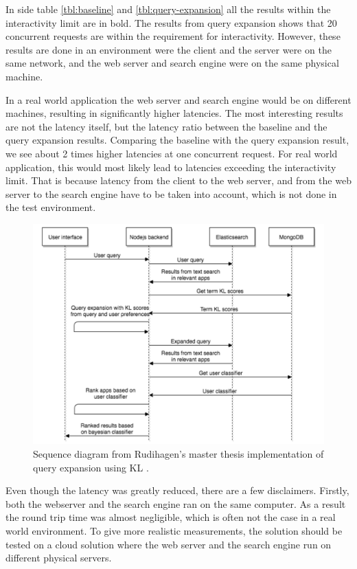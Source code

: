 In side table \ref{tbl:baseline} and \ref{tbl:query-expansion} all the results within the interactivity limit are in bold.
The results from query expansion shows that 20 concurrent requests are within the requirement for interactivity.
However, these results are done in an environment were the client and the server were on the same network,
and the web server and search engine were on the same physical machine.

In a real world application the web server and search engine would be on different machines,
resulting in significantly higher latencies.
The most interesting results are not the latency itself, but the latency ratio between the baseline and the query expansion results.
Comparing the baseline with the query expansion result, we see about 2 times higher latencies at one concurrent request.
For real world application, this would most likely lead to latencies exceeding the interactivity limit.
That is because latency from the client to the web server,
and from the web server to the search engine have to be taken into account,
which is not done in the test environment.


\begin{figure}[h!]
\centering \includegraphics[width=0.9\linewidth]{img/sequence-diagram-search-master-thesis.png}
\caption{Sequence diagram from Rudihagen's master thesis implementation of query expansion using KL \cite[p. 37]{master-thesis}.}
\label{fig:sequence-diagram-search-master}
\end{figure}

Even though the latency was greatly reduced, there are a few disclaimers.
Firstly, both the webserver and the search engine ran on the same computer.
As a result the round trip time was almost negligible, which is often not the case in a real world environment.
To give more realistic measurements, the solution should be tested on a cloud solution where the web server and the search engine run on different physical servers.

